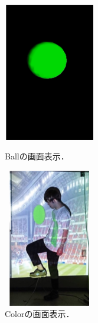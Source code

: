 \begin{figure}[p]
    \begin{minipage}{0.5\hsize}
     \begin{center}
      \includegraphics[width=4cm,height=6cm]{image/ball.png}
     \end{center}
     \caption[Ballの画面表示]{Ballの画面表示．}
     \label{ball}
    \end{minipage}
    \begin{minipage}{0.5\hsize}
     \begin{center}
      \includegraphics[width=4cm,height=6cm]{image/color.png}
     \end{center}
     \caption[Colorの画面表示]{Colorの画面表示．}
     \label{color}
    \end{minipage}
\end{figure}

